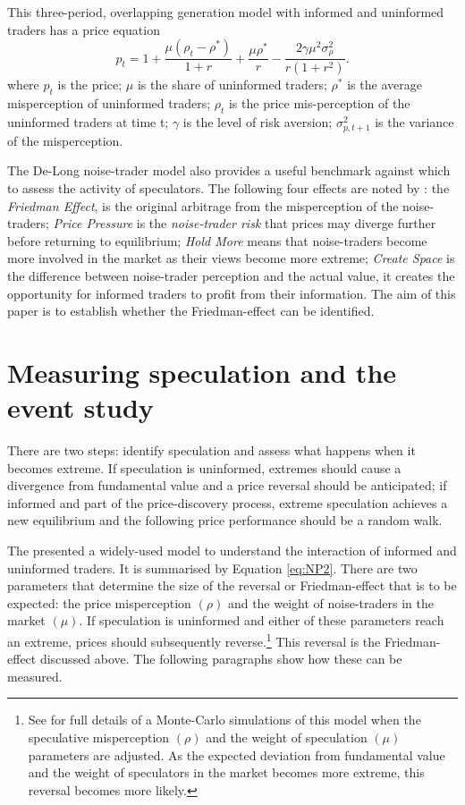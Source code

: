 \documentclass[preprint,12pt,authoryear]{elsarticle}
\begin{document}
This three-period, overlapping generation model with informed and uninformed traders has a price equation \begin{equation}
p_t = 1 + \frac{\mu(\rho_t - \rho^*)}{1 + r} + \frac{ \mu \rho^*}{r} - \frac{2 \gamma \mu^2 \sigma_{\rho}^2}{r(1 + r^2)}.
\label{eq:NP2}
\end{equation} 
 where $p_t$ is the price; $\mu$ is the share of uninformed traders; $\rho^*$ is the average misperception of uninformed traders; $\rho_t$ is the price mis-perception of the uninformed traders at time t; $\gamma$ is the level of risk aversion; $\sigma^2_{p,t+1}$ is the variance of the misperception.   

  The De-Long noise-trader model also provides a useful benchmark against which to assess the activity of speculators. The following four effects are noted by \citet[pp. 14-15]{Delong1990noise}:  the \emph{Friedman Effect}, is the original arbitrage from the misperception of the noise-traders; \emph{Price Pressure} is the \emph{noise-trader risk} that prices may diverge further before returning to equilibrium; \emph{Hold More} means that noise-traders become more involved in the market as their views become more extreme; \emph{Create Space} is the difference between noise-trader perception and the actual value, it creates the opportunity for informed traders to profit from their information. The aim of this paper is to establish whether the Friedman-effect can be identified.

\section{Measuring speculation and the event study}
There are two steps: identify speculation and assess what happens when it becomes extreme.  If speculation is uninformed, extremes should cause a divergence from fundamental value and a price reversal should be anticipated; if informed and part of the price-discovery process, extreme speculation achieves a new equilibrium and the following price performance should be a random walk.  

The \citet[pp. 14-15]{Delong1990noise} presented a widely-used model to understand the interaction of informed and uninformed traders.  It is summarised by Equation \ref{eq:NP2}. There are two parameters that determine the size of the reversal or Friedman-effect that is to be expected:  the price misperception $(\rho)$ and the weight of noise-traders in the market $(\mu)$.  If speculation is uninformed and either of these parameters reach an extreme, prices should subsequently reverse.\footnote{See \citet{Hayward2013} for full details of a Monte-Carlo simulations of this model when the speculative misperception $(\rho)$ and the weight of speculation $(\mu)$ parameters are adjusted. As the expected deviation from fundamental value and the weight of speculators in the market becomes more extreme, this reversal becomes more likely.}  This reversal is the Friedman-effect discussed above. The following paragraphs show how these can be measured. 
\end{document}
